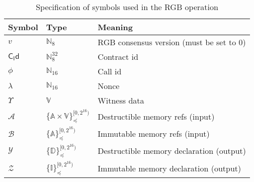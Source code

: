 \documentclass[a4paper]{article}
\begin{document}
\begin{table}[h]
\centering
\caption{Specification of symbols used in the RGB operation}\label{tab:op}
\begin{tabular}{ l l l }
\toprule
Symbol & Type & Meaning \\
\midrule
$v$ & $\mathbb{N}_8$ & RGB consensus version (must be set to $0$) \\
$\mathsf{C_Id}$ & $\mathbb{N}_8^{32}$ & Contract id \\
$\phi$ & $\mathbb{N}_{16}$ & Call id \\
$\lambda$ & $\mathbb{N}_{16}$ & Nonce \\
$\Upsilon$ & $\mathbb{V}$ & Witness data \\
$\mathcal{A}$ & $\{\mathbb{A} \times \mathbb{V}\}_\preceq^{[0, 2^{16})}$ & Destructible memory refs (input) \\
$\mathcal{B}$ & $\{\mathbb{A}\}_\preceq^{[0, 2^{16})}$ & Immutable memory refs (input) \\
$\mathcal{Y}$ & $\{\mathbb{D}\}_\preceq^{[0, 2^{16})}$ & Destructible memory declaration (output) \\
$\mathcal{Z}$ & $\{\mathbb{I}\}_\preceq^{[0, 2^{16})}$ & Immutable memory declaration (output) \\
\bottomrule
\end{tabular}
\end{table}
\end{document}
